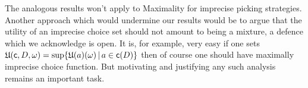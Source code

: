 \documentclass[a4paper]{article}
\newcommand\EU{\mathrm{EU}}
\newcommand\U{\mathfrak{U}} %
\renewcommand\c{\mathsf{c}} %
\newcommand{\todoold}[2][]{\todo[backgroundcolor=white,bordercolor=orange!10,linecolor=gray!10, #1,caption={},textcolor=gray]{Pre-rev: #2}}
\renewcommand{\color}[1]{}
\newcommand\SetDelimiter[1][]{
	\nonscript\,#1\vert \allowbreak \nonscript\,\mathopen{}}
\providecommand\given{\SetDelimiter}
\newenvironment{CCM rewritten}
{\begingroup\color{blue}} %
{\endgroup}              %
\begin{document}
%
The analogous results won't apply to Maximality for imprecise picking strategies. 
Another approach which would undermine our results would be to argue that the utility of an imprecise choice set should not amount to being a mixture, a defence which we acknowledge is open. It is, for example, very easy if one sets $\U(\c,D,\omega)=\sup\{\U(a)(\omega)\given a\in\c(D)\}$ then of course one should have maximally imprecise choice function. But motivating and justifying any such analysis remains an important task. 
%
%
\end{document}
